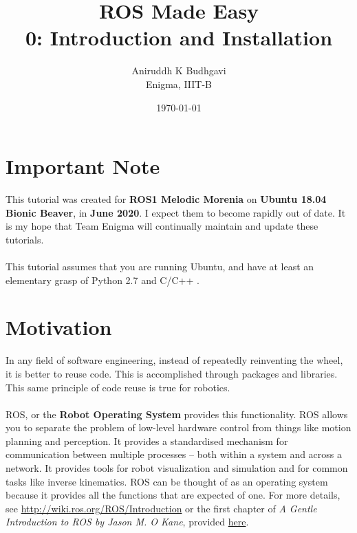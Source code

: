 \documentclass{article}
\title{ROS Made Easy \\0: Introduction and Installation}
\date{\today}
\author{Aniruddh K Budhgavi \\Enigma, IIIT-B}
\begin{document}
    \maketitle
    \section{Important Note}
    This tutorial was created for \textbf{ROS1 Melodic Morenia}
    on \textbf{Ubuntu 18.04 Bionic Beaver}, in \textbf{June 2020}.
    I expect them to become rapidly out of date. It is my hope
    that Team Enigma will continually maintain and update these tutorials.
    \\
    \\
    This tutorial assumes that you are running Ubuntu, and have at least an
    elementary grasp of Python 2.7 and C/C++ .
    \section{Motivation}
    In any field of software engineering, instead
    of repeatedly reinventing the wheel, it is better to
    reuse code. This is accomplished through packages and libraries.
    This same principle of code reuse is true for robotics.
    \\
    \\
    ROS, or the \textbf{Robot Operating System} provides this
    functionality. ROS allows you to separate the problem of
    low-level hardware control from things like motion planning and
    perception. It provides a standardised mechanism for communication
    between multiple processes -- both within a system and across a network.
    It provides tools for robot visualization and simulation
    and for common tasks like inverse kinematics. ROS can be thought
    of as an operating system because it provides all the functions
    that are expected of one. For more details, see \url{http://wiki.ros.org/ROS/Introduction}
    or the first chapter of \emph{A Gentle Introduction to ROS by Jason M. O Kane}, provided 
    \href{https://github.com/aniruddhkb/enigmatutorials/blob/master/intro2ros/tutorial_docs/agitr-small.pdf}{here}.
\end{document}
